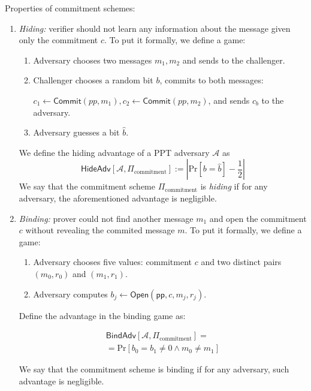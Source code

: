 \documentclass[../lecture-notes.tex]{subfiles}
\begin{document}
\begin{definition}
    Properties of commitment schemes:
    \begin{enumerate}
        \item \textit{Hiding: } verifier should not learn any information about the message given only the commitment $c$. To put it formally, we define a game:
        \begin{enumerate}
            \item Adversary chooses two messages $m_1,m_2$ and sends to the challenger.
            \item Challenger chooses a random bit $b$, commits to both messages: 
            
                $c_1 \gets \mathsf{Commit}(pp, m_1), c_2 \gets \mathsf{Commit}(pp,m_2)$, 
                    and sends $c_b$ to the adversary.
            \item Adversary guesses a bit $\hat{b}$.
        \end{enumerate}
        
        We define the hiding advantage of a PPT adversary $\mathcal{A}$ as 
        \begin{equation}
            \mathsf{HideAdv}[\mathcal{A}, \Pi_{\text{commitment}}] := \left| \text{Pr}[b=\hat{b}] - \frac{1}{2} \right|
        \end{equation}
        We say that the commitment scheme $\Pi_{\text{commitment}}$ is \textit{hiding} if for any adversary, the aforementioned advantage is negligible.
        
        \item \textit{Binding: } prover could not find another message $m_1$ and open the commitment $c$ without revealing the commited message $m$.
        To put it formally, we define a game:
        
        \begin{enumerate}
            \item Adversary chooses five values: commitment $c$ and two distinct pairs $(m_0,r_0)$ and $(m_1,r_1)$.
            \item Adversary computes $b_j \gets \mathsf{Open}(\mathsf{pp}, c, m_j, r_j)$. 
        \end{enumerate}
        
        Define the advantage in the binding game as:
        
        \begin{equation*}
            \begin{aligned}
                \mathsf{BindAdv}[\mathcal{A}, \Pi_{\text{commitment}}] = \\ = \text{Pr}[b_0 = b_1 \neq 0 \wedge m_0 \neq m_1]                
            \end{aligned}
        \end{equation*}

        We say that the commitment scheme is binding if for any adversary, such advantage is negligible.

    \end{enumerate}
\end{definition}
\end{document}
